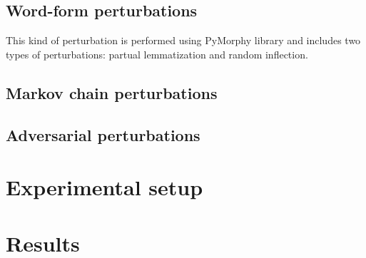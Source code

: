 \documentclass[11pt,a4paper]{article}
\begin{document}
\subsection{Word-form perturbations}

This kind of perturbation is performed using PyMorphy library and includes two types of perturbations: partual lemmatization and random inflection.

\subsection{Markov chain perturbations}

\subsection{Adversarial perturbations}

\section{Experimental setup}
\label{sec:setup}

\section{Results}
\label{sec:results}
\end{document}
